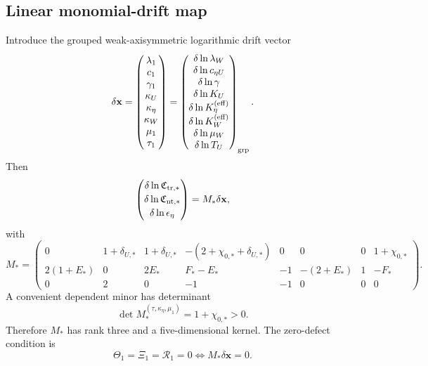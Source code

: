 \subsection{Linear monomial-drift map}
Introduce the grouped weak-axisymmetric logarithmic drift vector
\begin{equation}
\label{eq:app-part05-drift-vector}
\delta\mathbf x
=
\begin{pmatrix}
\lambda_1\\ c_1\\ \gamma_1\\ \kappa_U\\ \kappa_\eta\\ \kappa_W\\ \mu_1\\ \tau_1
\end{pmatrix}
=
\begin{pmatrix}
\delta\ln\lambda_W\\
\delta\ln c_{\eta U}\\
\delta\ln\gamma\\
\delta\ln K_U\\
\delta\ln K_\eta^{({\rm eff})}\\
\delta\ln K_W^{({\rm eff})}\\
\delta\ln\mu_W\\
\delta\ln T_U
\end{pmatrix}_{\rm grp}.
\end{equation}
Then
\begin{equation}
\label{eq:app-part05-Mstar-drift-map}
\begin{pmatrix}
\delta\ln\mathfrak C_{{\rm tr},*}\\[2pt]
\delta\ln\mathfrak C_{{\rm nt},*}\\[2pt]
\delta\ln\epsilon_\eta
\end{pmatrix}
=
M_*\delta\mathbf x,
\end{equation}
with
\begin{equation}
\label{eq:app-part05-Mstar-matrix}
M_*=
\begin{pmatrix}
0 & 1+\delta_{U,*} & 1+\delta_{U,*} & -(2+\chi_{0,*}+\delta_{U,*}) & 0 & 0 & 0 & 1+\chi_{0,*}\\[4pt]
2(1+E_*) & 0 & 2E_* & F_*-E_* & -1 & -(2+E_*) & 1 & -F_*\\[4pt]
0 & 2 & 0 & -1 & -1 & 0 & 0 & 0
\end{pmatrix}.
\end{equation}
A convenient dependent minor has determinant
\begin{equation}
\label{eq:app-part05-Mstar-minor}
\det M_*^{(\tau,\kappa_\eta,\mu_1)}=1+\chi_{0,*}>0.
\end{equation}
Therefore \(M_*\) has rank three and a five-dimensional kernel.  The zero-defect condition is
\begin{equation}
\label{eq:app-part05-zero-defect-Mstar}
\Theta_1=\Xi_1=\mathcal R_1=0
\iff
M_*\delta\mathbf x=0.
\end{equation}

